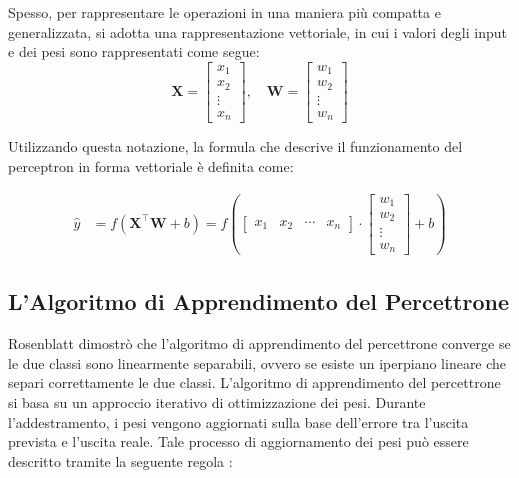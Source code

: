 Spesso, per rappresentare le operazioni in una maniera più compatta e generalizzata, si adotta 
una rappresentazione vettoriale, in cui i valori degli input e dei pesi sono rappresentati come segue:
\[
    \mathbf{X} = \begin{bmatrix} x_1 \\ x_2 \\ \vdots \\ x_n \end{bmatrix}, \quad
    \mathbf{W} = \begin{bmatrix} w_1 \\ w_2 \\ \vdots \\ w_n \end{bmatrix}
\]
    
Utilizzando questa notazione, la formula che descrive il funzionamento del perceptron in 
forma vettoriale è definita come:

\begin{equation}
    \begin{split}
        \hat{y} &= f\left( \mathbf{X}^\top \mathbf{W} + b \right)
        = f\left( 
        \begin{bmatrix} x_1 & x_2 & \cdots & x_n \end{bmatrix} \cdot
        \begin{bmatrix} w_1 \\ w_2 \\ \vdots \\ w_n \end{bmatrix}
        + b
        \right)%
    \end{split}
    \label{eq:formulaPercettroneVettoriale}
\end{equation}

\subsection{L'Algoritmo di Apprendimento del Percettrone}
Rosenblatt dimostrò che l’algoritmo di apprendimento del percettrone converge se le
 due classi sono linearmente separabili, ovvero se esiste un iperpiano lineare che separi
 correttamente le due classi.
L'algoritmo di apprendimento del percettrone si basa su un approccio iterativo di 
ottimizzazione dei pesi. Durante l'addestramento, i pesi vengono aggiornati sulla 
base dell'errore tra l'uscita prevista e l'uscita reale. Tale processo di aggiornamento 
dei pesi può essere descritto tramite la seguente regola 
\cite{APPRENDIMENTO_PRECETTRONE,ASPETTI_APPRENDIMENTO_PERCETTONE,IMAMGINE_MODELLO_MAT_NEURONE_GENERALE_PERCETTONE}:

